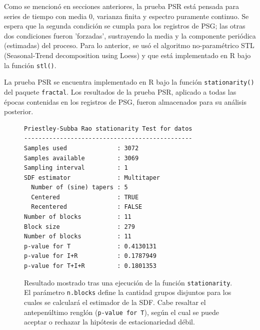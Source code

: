 \documentclass[12pt,a4paper]{mitthesis}
\begin{document}
%

Como se mencion\'o en secciones anteriores, la prueba PSR est\'a pensada para series de tiempo con 
media 0, varianza finita y espectro puramente continuo. Se espera que la segunda 
condici\'on se cumpla para los registros de PSG; las otras dos condiciones fueron 
'forzadas', sustrayendo la media y la componente peri\'odica (estimadas) del proceso.
Para lo anterior, se us\'o el algoritmo no-param\'etrico STL (Seasonal-Trend decomposition using Loess) 
\cite{Cleveland1990} y que est\'a implementado en R bajo la funci\'on \texttt{stl()}.

La prueba PSR se encuentra implementado en R bajo la funci\'on \texttt{stationarity()} del paquete 
\texttt{fractal}.
Los resultados de la prueba PSR, aplicado a todas las \'epocas contenidas en los registros de PSG,
fueron almacenados para su an\'alisis posterior.

\begin{figure}
\centering
\begin{lstlisting}[caption={}]
Priestley-Subba Rao stationarity Test for datos
-----------------------------------------------
Samples used              : 3072 
Samples available         : 3069 
Sampling interval         : 1 
SDF estimator             : Multitaper 
  Number of (sine) tapers : 5 
  Centered                : TRUE 
  Recentered              : FALSE 
Number of blocks          : 11 
Block size                : 279 
Number of blocks          : 11 
p-value for T             : 0.4130131 
p-value for I+R           : 0.1787949 
p-value for T+I+R         : 0.1801353 
\end{lstlisting}
\caption{Resultado mostrado tras una ejecuci\'on de la funci\'on \texttt{stationarity}.
El par\'ametro \texttt{n.blocks} define la cantidad grupos disjuntos para los cuales se 
calcular\'a el estimador de la SDF.
Cabe resaltar el antepen\'ultimo rengl\'on (\texttt{p-value for T}), seg\'un el cual se puede
aceptar o rechazar la hip\'otesis de estacionariedad d\'ebil.}
\label{res_psr}
\end{figure}
\end{document}
